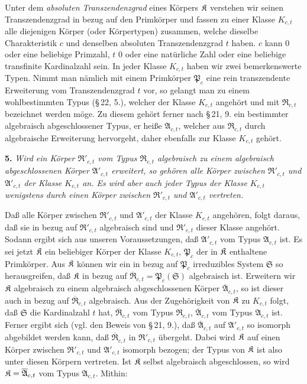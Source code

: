 Unter dem \emph{absoluten Transzendenzgrad} eines Körpers \(\mathfrak K\) verstehen wir seinen Transzendenzgrad in bezug auf den Primkörper und fassen zu einer Klasse \(K_{c,t}\) alle diejenigen Körper (oder Körpertypen) zusammen, welche dieselbe Charakteristik \(c\) und denselben absoluten Transzendenzgrad \(t\) haben. \(c\) kann 0 oder eine beliebige Primzahl, \(t\) 0 oder eine natürliche Zahl oder eine beliebige transfinite Kardinalzahl sein. In jeder Klasse \(K_{c,t}\) haben wir zwei bemerkenswerte Typen. Nimmt man nämlich mit einem Primkörper \(\mathfrak P_c\) eine rein transzendente Erweiterung vom Transzendenzgrad \(t\) vor, so gelangt man zu einem wohlbestimmten Typus (\S\,22, 5.), welcher der Klasse \(K_{c,t}\) angehört und mit \(\mathfrak R_{c,t}\) bezeichnet werden möge. Zu diesem gehört ferner nach \S\,21, 9. ein bestimmter algebraisch abgeschlossener Typus, er heiße \(\mathfrak A_{c,t}\), welcher aus \(\mathfrak R_{c,t}\) durch algebraische Erweiterung hervorgeht, daher ebenfalls zur Klasse \(K_{c,t}\) gehört.

\textbf{5.} \emph{Wird ein Körper \(\mathfrak R'_{c,t}\) vom Typus \(\mathfrak R_{c,t}\) algebraisch zu einem algebraisch abgeschlossenen Körper \(\mathfrak A'_{c,t}\) erweitert, so gehören alle Körper zwischen \(\mathfrak R'_{c,t}\) und \(\mathfrak A'_{c,t}\) der Klasse \(K_{c,t}\) an. Es wird aber auch jeder Typus der Klasse \(K_{c,t}\) wenigstens durch einen Körper zwischen \(\mathfrak R'_{c,t}\) und \(\mathfrak A'_{c,t}\) vertreten.}

Daß alle Körper zwischen \(\mathfrak R'_{c,t}\) und \(\mathfrak A'_{c,t}\) der Klasse \(K_{c,t}\) angehören, folgt daraus, daß sie in bezug auf \(\mathfrak R'_{c,t}\) algebraisch sind und \(\mathfrak R'_{c,t}\) dieser Klasse angehört. Sodann ergibt sich aus unseren Voraussetzungen, daß \(\mathfrak A'_{c,t}\) vom Typus \(\mathfrak A_{c,t}\) ist. Es sei jetzt \(\mathfrak K\) ein beliebiger Körper der Klasse \(K_{c,t}\), \(\mathfrak P_c\) der in \(\mathfrak K\) enthaltene Primkörper. Aus \(\mathfrak K\) können wir ein in bezug auf \(\mathfrak P_c\) irreduzibles System \(\mathfrak S\) so herausgreifen, daß \(\mathfrak K\) in bezug auf \(\overline{\mathfrak R}_{c,t}=\mathfrak P_c(\mathfrak S)\) algebraisch ist. Erweitern wir \(\mathfrak K\) algebraisch zu einem algebraisch abgeschlossenen Körper \(\overline{\mathfrak A}_{c,t}\), so ist dieser auch in bezug auf \(\overline{\mathfrak R}_{c,t}\) algebraisch. Aus der Zugehörigkeit von \(\mathfrak K\) zu \(K_{c,t}\) folgt, daß \(\mathfrak S\) die Kardinalzahl \(t\) hat, \(\overline{\mathfrak R}_{c,t}\) vom Typus \(\mathfrak R_{c,t}\), \(\overline{\mathfrak A}_{c,t}\) vom Typus \(\mathfrak A_{c,t}\) ist. Ferner ergibt sich (vgl. den Beweis von \S\,21, 9.), daß \(\overline{\mathfrak A}_{c,t}\) auf \(\mathfrak A'_{c,t}\) so isomorph abgebildet werden kann, daß \(\overline{\mathfrak R}_{c,t}\) in \(\mathfrak R'_{c,t}\) übergeht. Dabei wird \(\mathfrak K\) auf einen Körper zwischen \(\mathfrak R'_{c,t}\) und \(\mathfrak A'_{c,t}\) isomorph bezogen; der Typus von \(\mathfrak K\) ist also unter diesen Körpern vertreten. Ist \(\mathfrak K\) selbst algebraisch abgeschlossen, so wird \(\mathfrak K=\overline{\mathfrak A}_{c,t}\) vom Typus \(\mathfrak A_{c,t}\). Mithin:

